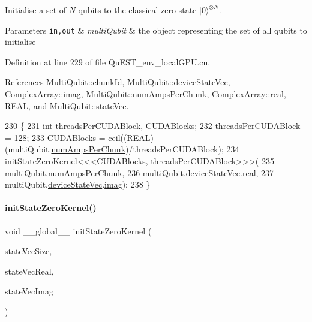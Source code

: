 Initialise a set of $ N $ qubits to the classical zero state $ {| 0 \rangle}^{\otimes N} $. 


\begin{DoxyParams}[1]{Parameters}
\mbox{\tt in,out}  & {\em multi\+Qubit} & the object representing the set of all qubits to initialise \\
\hline
\end{DoxyParams}


Definition at line 229 of file Qu\+E\+S\+T\+\_\+env\+\_\+local\+G\+P\+U.\+cu.



References Multi\+Qubit\+::chunk\+Id, Multi\+Qubit\+::device\+State\+Vec, Complex\+Array\+::imag, Multi\+Qubit\+::num\+Amps\+Per\+Chunk, Complex\+Array\+::real, R\+E\+AL, and Multi\+Qubit\+::state\+Vec.


\begin{DoxyCode}
230 \{
231     \textcolor{keywordtype}{int} threadsPerCUDABlock, CUDABlocks;
232     threadsPerCUDABlock = 128;
233     CUDABlocks = ceil((\mbox{\hyperlink{QuEST__precision_8h_a4b654506f18b8bfd61ad2a29a7e38c25}{REAL}})(multiQubit.\mbox{\hyperlink{structMultiQubit_a1cad83601a78635dd278259c7ed54f18}{numAmpsPerChunk}})/threadsPerCUDABlock);
234     initStateZeroKernel<<<CUDABlocks, threadsPerCUDABlock>>>(
235         multiQubit.\mbox{\hyperlink{structMultiQubit_a1cad83601a78635dd278259c7ed54f18}{numAmpsPerChunk}}, 
236         multiQubit.\mbox{\hyperlink{structMultiQubit_a59ac613486a41b8c9a4b6e79cc8d2cc3}{deviceStateVec}}.\mbox{\hyperlink{structComplexArray_a4195cac6c784ea1b6271f1c7dba1548a}{real}}, 
237         multiQubit.\mbox{\hyperlink{structMultiQubit_a59ac613486a41b8c9a4b6e79cc8d2cc3}{deviceStateVec}}.\mbox{\hyperlink{structComplexArray_a79dde47c7ae530c79cebfdf57b225968}{imag}});
238 \}
\end{DoxyCode}
\mbox{\label{QuEST__env__localGPU_8cu_aa6b649062c49c37ac93aac0d6be6eedd}} 
\paragraph{\texorpdfstring{init\+State\+Zero\+Kernel()}{initStateZeroKernel()}}
{\footnotesize\ttfamily void \+\_\+\+\_\+global\+\_\+\+\_\+ init\+State\+Zero\+Kernel (\begin{DoxyParamCaption}\item[{long long int}]{state\+Vec\+Size,  }\item[{\mbox{\hyperlink{QuEST__precision_8h_a4b654506f18b8bfd61ad2a29a7e38c25}{R\+E\+AL}} $\ast$}]{state\+Vec\+Real,  }\item[{\mbox{\hyperlink{QuEST__precision_8h_a4b654506f18b8bfd61ad2a29a7e38c25}{R\+E\+AL}} $\ast$}]{state\+Vec\+Imag }\end{DoxyParamCaption})}



